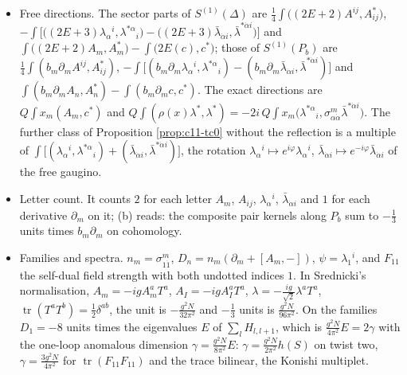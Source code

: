 \begin{remark}
\begin{itemize}
\item Free directions. The sector parts of $S^{(1)}(\Delta)$ are $\tfrac14\int\big((2E+2)A^{ij},A^*_{ij}\big)$, $-\int\big[\big((2E+3)\lambda_\alpha{}^i,\lambda^{*\alpha}{}_i\big)-\big((2E+3)\bar\lambda_{\dot\alpha i},\bar\lambda^{*\dot\alpha i}\big)\big]$ and $\int\big((2E+2)A_m,A^*_m\big)-\int\big(2E(c),c^*\big)$; those of $S^{(1)}(P_b)$ are $\tfrac14\int(b_m\partial_mA^{ij},A^*_{ij})$, $-\int\big[(b_m\partial_m\lambda_\alpha{}^i,\lambda^{*\alpha}{}_i)-(b_m\partial_m\bar\lambda_{\dot\alpha i},\bar\lambda^{*\dot\alpha i})\big]$ and $\int(b_m\partial_mA_n,A^*_n)-\int(b_m\partial_mc,c^*)$. The exact directions are $Q\int x_m(A_m,c^*)$ and $Q\int(\rho(x)\lambda^*,\lambda^*)=-2i\,Q\int x_m\big(\lambda^{*\alpha}{}_i,\sigma^m_{\alpha\dot\alpha}\bar\lambda^{*\dot\alpha i}\big)$. The further class of Proposition \ref{prop:c11-tc0} without the reflection is a multiple of $\int\big[(\lambda_\alpha{}^i,\lambda^{*\alpha}{}_i)+(\bar\lambda_{\dot\alpha i},\bar\lambda^{*\dot\alpha i})\big]$, the rotation $\lambda_\alpha{}^i\mapsto e^{i\varphi}\lambda_\alpha{}^i$, $\bar\lambda_{\dot\alpha i}\mapsto e^{-i\varphi}\bar\lambda_{\dot\alpha i}$ of the free gaugino.
\item Letter count. It counts $2$ for each letter $A_m$, $A_{ij}$, $\lambda_\alpha{}^i$, $\bar\lambda_{\dot\alpha i}$ and $1$ for each derivative $\partial_m$ on it; (b) reads: the composite pair kernels along $P_b$ sum to $-\tfrac13$ units times $b_m\partial_m$ on cohomology.
\item Families and spectra. $n_m=\sigma^m_{1\dot1}$, $D_n=n_m(\partial_m+[A_m,-])$, $\psi=\lambda_1{}^i$, and $F_{11}$ the self-dual field strength with both undotted indices $1$. In Srednicki's normalisation, $A_m=-igA^a_mT^a$, $A_I=-igA^a_IT^a$, $\lambda=-\tfrac{ig}{\sqrt2}\lambda^aT^a$, $\operatorname{tr}(T^aT^b)=\tfrac12\delta^{ab}$, the unit is $-\frac{g^2N}{32\pi^2}$ and $-\tfrac13$ units is $\frac{g^2N}{96\pi^2}$. On the families $D_1=-8$ units times the eigenvalues $E$ of $\sum_lH_{l,l+1}$, which is $\frac{g^2N}{4\pi^2}E=2\gamma$ with the one-loop anomalous dimension $\gamma=\frac{g^2N}{8\pi^2}E$: $\gamma=\frac{g^2N}{2\pi^2}h(S)$ on twist two, $\gamma=\frac{3g^2N}{4\pi^2}$ for $\operatorname{tr}(F_{11}F_{11})$ and the trace bilinear, the Konishi multiplet.

\end{itemize}
\end{remark}
